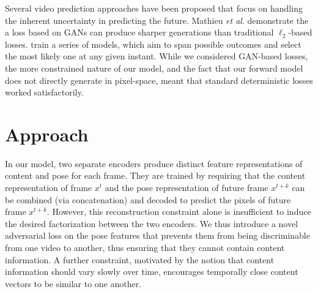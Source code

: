 \documentclass{article}
\newcommand{\etal}{\textit{et al}.\:}
\begin{document}
Several video prediction approaches have been proposed that focus on
handling the inherent uncertainty in predicting the future. Mathieu
\etal\cite{mathieu2016} demonstrate the a loss based on GANs can produce sharper generations than traditional
$\ell_2$-based losses. \cite{Vondrick16} train a series of models,
which aim to span possible outcomes and select the most likely one at
any given instant. While we considered GAN-based losses, the more
constrained nature of our model, and the fact that our forward model does not directly
generate in pixel-space, meant that standard deterministic losses
worked satisfactorily. 

\vspace{-3mm}\section{Approach}\vspace{-3mm}%

In our model, two separate encoders produce distinct feature representations of content and pose for each frame. They are trained by requiring that the content representation of frame $x^t$ and the pose representation of future frame $x^{t+k}$ can be combined (via concatenation) and decoded to predict the pixels of future frame $x^{t+k}$. However, this reconstruction constraint alone is insufficient to induce the desired factorization between the two encoders. We thus introduce a novel adversarial loss on the pose features that prevents them from being discriminable from one video  to another, thus ensuring that they cannot contain content information. A further constraint, motivated by the notion that content information should vary slowly over time, encourages temporally close content vectors to be similar to one another.
\end{document}

